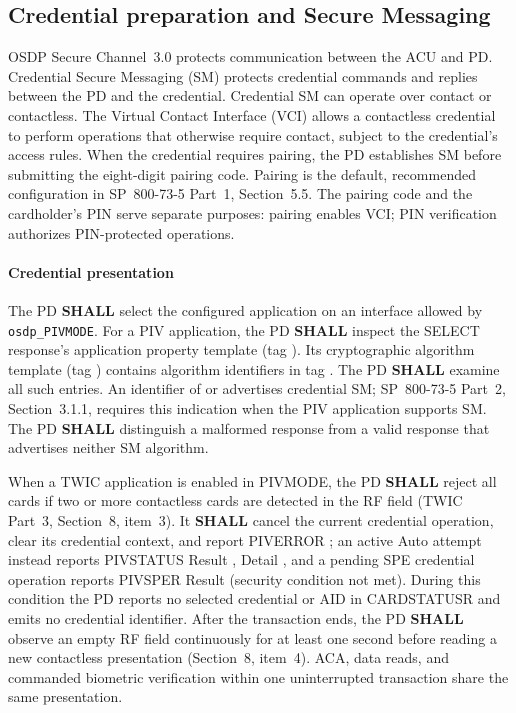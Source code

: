 \subsection{Credential preparation and Secure Messaging}
\label{sec:credential-sm-flow}

OSDP Secure Channel~3.0 protects communication between the ACU and PD.
Credential Secure Messaging (SM) protects credential commands and replies between
the PD and the credential. Credential SM can operate over contact or contactless.
The Virtual Contact Interface (VCI) allows a contactless credential to perform
operations that otherwise require contact, subject to the credential's access rules.
When the credential requires pairing, the PD establishes SM before submitting the
eight-digit pairing code. Pairing is the default, recommended configuration in SP~800-73-5 Part~1,
Section~5.5. The pairing code and the cardholder's PIN serve separate purposes:
pairing enables VCI; PIN verification authorizes PIN-protected operations.

\paragraph{Credential presentation}
The PD \textbf{SHALL} select the configured application on an interface allowed
by \texttt{osdp\_PIVMODE}. For a PIV application, the PD \textbf{SHALL} inspect
the SELECT response's application property template (tag ). Its
cryptographic algorithm template (tag ) contains algorithm identifiers
in tag . The PD \textbf{SHALL} examine all such entries. An identifier
of  or  advertises credential SM; SP~800-73-5 Part~2,
Section~3.1.1, requires this indication when the PIV application supports SM.
The PD \textbf{SHALL} distinguish a malformed response from a valid response
that advertises neither SM algorithm.

When a TWIC application is enabled in PIVMODE, the PD \textbf{SHALL} reject
all cards if two or more contactless cards are detected in the RF field
(TWIC Part~3, Section~8, item~3). It \textbf{SHALL} cancel the current
credential operation, clear its credential context, and report PIVERROR
; an active Auto attempt instead reports PIVSTATUS Result
, Detail , and a pending SPE credential operation
reports PIVSPER Result  (security condition not met).
During this condition the PD reports no
selected credential or AID in CARDSTATUSR and emits no credential identifier.
After the transaction ends, the PD \textbf{SHALL} observe an empty RF field
continuously for at least one second before reading a new contactless
presentation (Section~8, item~4). ACA, data reads, and commanded biometric
verification within one uninterrupted transaction share the same presentation.

